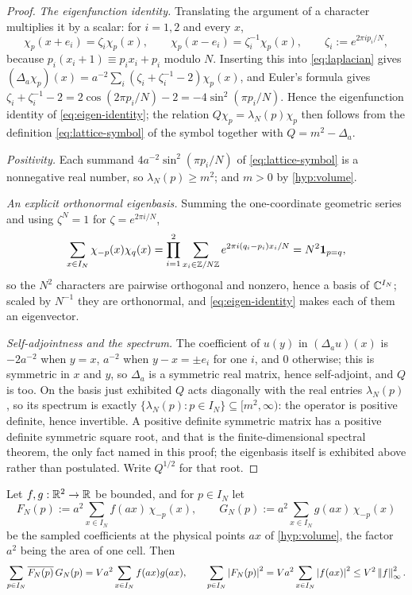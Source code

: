 \begin{proof}
\emph{The eigenfunction identity.} Translating the argument of a character multiplies it by a scalar: for
$i=1,2$ and every $x$,
\[
  \chi_p(x+e_i)=\zeta_i\chi_p(x),\qquad \chi_p(x-e_i)=\zeta_i^{-1}\chi_p(x),
  \qquad \zeta_i:=e^{2\pi ip_i/N},
\]
because $p_i(x_i+1)\equiv p_ix_i+p_i$ modulo $N$. Inserting this into \eqref{eq:laplacian} gives
$(\Delta_a\chi_p)(x)=a^{-2}\sum_i(\zeta_i+\zeta_i^{-1}-2)\chi_p(x)$, and Euler's formula gives
$\zeta_i+\zeta_i^{-1}-2=2\cos(2\pi p_i/N)-2=-4\sin^2(\pi p_i/N)$. Hence the eigenfunction identity of
\eqref{eq:eigen-identity}; the relation $Q\chi_p=\lambda_N(p)\chi_p$ then follows from the definition
\eqref{eq:lattice-symbol} of the symbol together with $Q=m^2-\Delta_a$.

\emph{Positivity.} Each summand $4a^{-2}\sin^2(\pi p_i/N)$ of \eqref{eq:lattice-symbol} is a nonnegative
real number, so $\lambda_N(p)\ge m^2$; and $m>0$ by \cref{hyp:volume}.

\emph{An explicit orthonormal eigenbasis.} Summing the one-coordinate geometric series and using
$\zeta^N=1$ for $\zeta=e^{2\pi i/N}$,
\[
  \sum_{x\in I_N}\chi_{-p}(x)\chi_q(x)
  =\prod_{i=1}^{2}\sum_{x_i\in\mathbb{Z}/N\mathbb{Z}}e^{2\pi i(q_i-p_i)x_i/N}=N^2\mathbf 1_{p=q} ,
\]
so the $N^2$ characters are pairwise orthogonal and nonzero, hence a basis of $\mathbb{C}^{I_N}$; scaled by
$N^{-1}$ they are orthonormal, and \eqref{eq:eigen-identity} makes each of them an eigenvector.

\emph{Self-adjointness and the spectrum.} The coefficient of $u(y)$ in $(\Delta_au)(x)$ is $-2a^{-2}$ when
$y=x$, $a^{-2}$ when $y-x=\pm e_i$ for one $i$, and $0$ otherwise; this is symmetric in $x$ and $y$, so
$\Delta_a$ is a symmetric real matrix, hence self-adjoint, and $Q$ is too. On the basis just exhibited $Q$
acts diagonally with the real entries $\lambda_N(p)$, so its spectrum is exactly
$\{\lambda_N(p):p\in I_N\}\subseteq[m^2,\infty)$: the operator is positive definite, hence invertible. A
positive definite symmetric matrix has a positive definite symmetric square root, and that is the
finite-dimensional spectral theorem, the only fact named in this proof; the eigenbasis itself is
exhibited above rather than postulated. Write $Q^{1/2}$ for that root.
\end{proof}

\begin{lemma}\label{lem:finite-parseval}
Let $f,g:\mathbb{R}^2\to\mathbb{R}$ be bounded, and for $p\in I_N$ let
\begin{equation}\label{eq:sampled-coefficient}
  F_N(p):=a^2\sum_{x\in I_N}f(ax)\,\chi_{-p}(x),\qquad
  G_N(p):=a^2\sum_{x\in I_N}g(ax)\,\chi_{-p}(x)
\end{equation}
be the sampled coefficients at the physical points $ax$ of \cref{hyp:volume}, the factor $a^2$ being the
area of one cell. Then
\begin{equation}\label{eq:parseval}
  \sum_{p\in I_N}\overline{F_N(p)}\,G_N(p)=Va^2\sum_{x\in I_N}f(ax)g(ax),
  \qquad
  \sum_{p\in I_N}\left| F_N(p) \right|^2=Va^2\sum_{x\in I_N}\left| f(ax) \right|^2\le V^2\left\| f \right\|_\infty^2 .
\end{equation}
\end{lemma}

